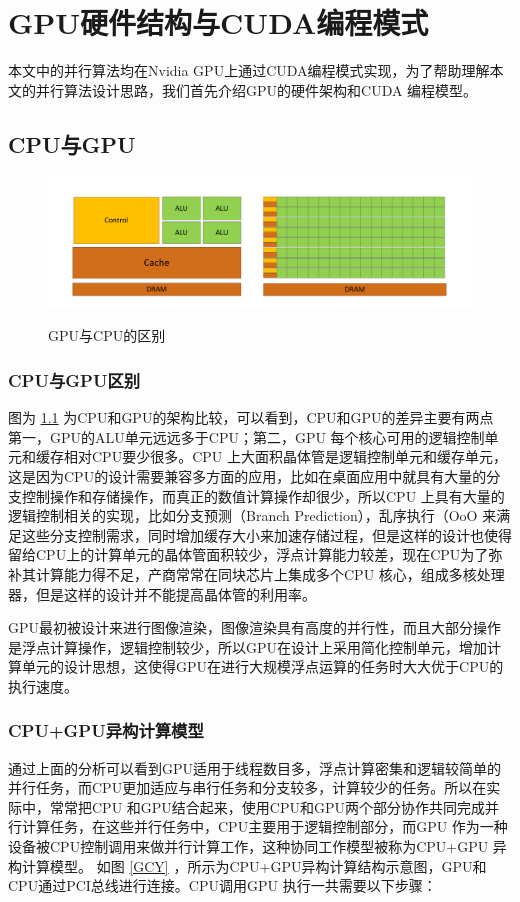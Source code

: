 \chapter{GPU硬件结构与CUDA编程模式}
本文中的并行算法均在Nvidia GPU上通过CUDA编程模式实现，为了帮助理解本文的并行算法设计思路，我们首先介绍GPU的硬件架构和CUDA 编程模型。
\section{CPU与GPU}
\begin{figure}
\setlength{\belowcaptionskip}{-0.5cm}
  \begin{center}
    {\includegraphics[width=1 \textwidth]{figures/GPU&CPU.pdf}}
    \end{center}
  \caption{{\footnotesize{GPU与CPU的区别}}}
  \label{GCD}
\end{figure}
\subsection{CPU与GPU区别}

图为 \ref{GCD} 为CPU和GPU的架构比较，可以看到，CPU和GPU的差异主要有两点 第一，GPU的ALU单元远远多于CPU；第二，GPU 每个核心可用的逻辑控制单元和缓存相对CPU要少很多。CPU 上大面积晶体管是逻辑控制单元和缓存单元，这是因为CPU的设计需要兼容多方面的应用，比如在桌面应用中就具有大量的分支控制操作和存储操作，而真正的数值计算操作却很少，所以CPU 上具有大量的逻辑控制相关的实现，比如分支预测（Branch Prediction），乱序执行（OoO 来满足这些分支控制需求，同时增加缓存大小来加速存储过程，但是这样的设计也使得留给CPU上的计算单元的晶体管面积较少，浮点计算能力较差，现在CPU为了弥补其计算能力得不足，产商常常在同块芯片上集成多个CPU 核心，组成多核处理器，但是这样的设计并不能提高晶体管的利用率。

GPU最初被设计来进行图像渲染，图像渲染具有高度的并行性，而且大部分操作是浮点计算操作，逻辑控制较少，所以GPU在设计上采用简化控制单元，增加计算单元的设计思想，这使得GPU在进行大规模浮点运算的任务时大大优于CPU的执行速度。
\subsection{CPU+GPU异构计算模型}
通过上面的分析可以看到GPU适用于线程数目多，浮点计算密集和逻辑较简单的并行任务，而CPU更加适应与串行任务和分支较多，计算较少的任务。所以在实际中，常常把CPU 和GPU结合起来，使用CPU和GPU两个部分协作共同完成并行计算任务，在这些并行任务中，CPU主要用于逻辑控制部分，而GPU 作为一种设备被CPU控制调用来做并行计算工作，这种协同工作模型被称为CPU+GPU 异构计算模型。
如图 \ref{GCY} ，所示为CPU+GPU异构计算结构示意图，GPU和CPU通过PCI总线进行连接。CPU调用GPU 执行一共需要以下步骤：

